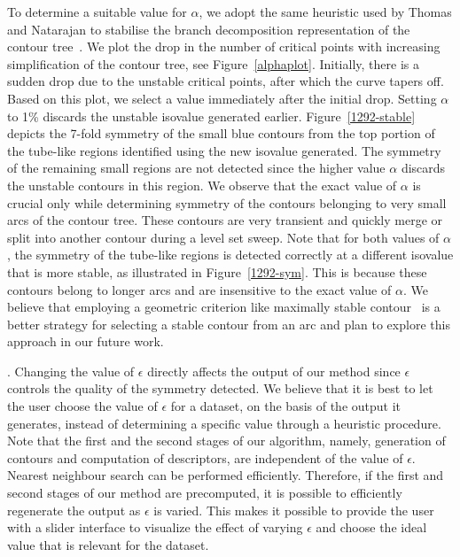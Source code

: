 \documentclass[review,journal]{vgtc}         %
\begin{document}
To determine a suitable value for $\alpha$, we adopt the same heuristic used by Thomas and Natarajan
to stabilise the branch decomposition representation of the contour tree~\cite{ThomN11}. We plot
the drop in the number of critical points with increasing simplification of the contour tree,
see Figure~\ref{alphaplot}. Initially, there is a sudden drop due to the unstable critical points, 
after which the curve tapers off. Based on this plot, we select a value immediately after the initial drop.
Setting $\alpha$ to 1\% discards the unstable isovalue generated earlier. 
Figure~\ref{1292-stable} depicts the 7-fold symmetry of the small blue contours from the top portion of
the tube-like regions identified using the new isovalue generated. The symmetry of the remaining small regions
are not detected since the higher value $\alpha$ discards the unstable contours in this region. 
We observe that the exact value of $\alpha$ is crucial only while determining symmetry of the contours belonging to 
very small arcs of the contour tree. These contours are very transient and quickly merge or split
into another contour during a level set sweep. Note that for both values of $\alpha$, the symmetry of
the tube-like regions is detected correctly at a different isovalue that is more stable, 
as illustrated in Figure~\ref{1292-sym}. This is because these contours belong to longer arcs and are 
insensitive to the exact value of $\alpha$. We believe that employing a geometric criterion like 
maximally stable contour~\cite{MatasCUP04} is a better strategy for selecting a stable contour 
from an arc and plan to explore this approach in our future work.

.
Changing the value of $\epsilon$ directly affects the output of  our method since $\epsilon$
controls the quality of the symmetry detected. We believe that it is best to let the user choose the value
of $\epsilon$ for a dataset, on the basis of the output it generates, instead of determining a specific
value through a heuristic procedure. Note that the first and the second stages of our algorithm,
namely, generation of contours and computation of descriptors, are independent of the value of 
$\epsilon$. Nearest neighbour search can be performed efficiently. Therefore, if the first and 
second stages of our method are precomputed, it is possible to efficiently regenerate the output
as $\epsilon$ is varied. This makes it possible to provide the user with a slider interface
to visualize the effect of varying $\epsilon$ and choose the ideal value that is relevant
for the dataset.
\end{document}
